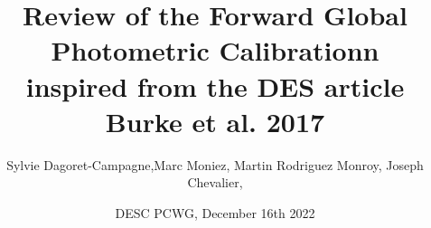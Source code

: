 \documentclass{beamer}
\title[FGCM Simulation]{\large Review of the Forward Global Photometric Calibrationn\\
{\small inspired from the DES article Burke et al. 2017}}
\author[S. Dagoret-Campagne]{
Sylvie Dagoret-Campagne,Marc Moniez, Martin Rodriguez Monroy, Joseph Chevalier,}
\institute[IJCLab]{
  IJCLab,
  CNRS/IN2P3 \& Université Paris-Saclay,
  Orsay, France }
\date[IJCLab, Dec 16th 2022]{DESC PCWG, December 16th 2022}
\begin{document}
\begin{frame}
  \titlepage
\end{frame}






\end{document}
